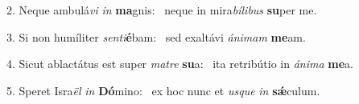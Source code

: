 2. Neque ambulá\textit{vi} \textit{in} \textbf{ma}gnis: \ast\  neque in mira\textit{bí}\textit{li}\textit{bus} \textbf{su}per me.\

3. Si non humíliter \textit{sen}\textit{ti}\textbf{é}bam: \ast\  sed exaltávi \textit{á}\textit{ni}\textit{mam} \textbf{me}am.\

4. Sicut ablactátus est super \textit{ma}\textit{tre} \textbf{su}a: \ast\  ita retribútio in \textit{á}\textit{ni}\textit{ma} \textbf{me}a.\

5. Speret Isra\textit{ël} \textit{in} \textbf{Dó}mino: \ast\  ex hoc nunc et \textit{us}\textit{que} \textit{in} \textbf{sǽ}culum.\

